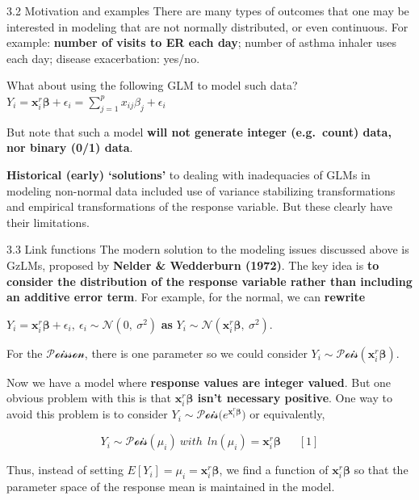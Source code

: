 \documentclass[
  9pt,
  ignorenonframetext,
]{beamer}
\begin{document}
\begin{frame}{3.2 Motivation and examples}
\protect\hypertarget{motivation-and-examples}{}
There are many types of outcomes that one may be interested in modeling
that are not normally distributed, or even continuous. For example:
\textbf{number of visits to ER each day}; number of asthma inhaler uses
each day; disease exacerbation: yes/no.

What about using the following GLM to model such data?\\
\(Y_i=\pmb x_i^r \pmb \beta+\epsilon_i=\sum_{j=1}^p x_{ij} \beta_j +\epsilon_i\)

But note that such a model \textbf{will not generate integer
(e.g.~count) data, nor binary (0/1) data}.

\textbf{Historical (early) `solutions'} to dealing with inadequacies of
GLMs in modeling non-normal data included use of variance stabilizing
transformations and empirical transformations of the response variable.
But these clearly have their limitations.
\end{frame}

\begin{frame}{3.3 Link functions}
\protect\hypertarget{link-functions}{}
The modern solution to the modeling issues discussed above is GzLMs,
proposed by \textbf{Nelder \& Wedderburn (1972)}. The key idea is
\textbf{to consider the distribution of the response variable rather
than including an additive error term}. For example, for the normal, we
can \textbf{rewrite}

\(Y_i=\pmb x_i^r \pmb \beta+\epsilon_i,\  \epsilon_i\sim \mathcal N(0,\ \sigma^2)\)
\textbf{as} \(Y_i\sim \mathcal N(\pmb x_i^r \pmb \beta,\ \sigma^2)\).

For the \(\mathcal {Poisson}\), there is one parameter so we could
consider \(Y_i \sim \mathcal {Pois} (\pmb x_i^r \pmb \beta)\).

Now we have a model where \textbf{response values are integer valued}.
But one obvious problem with this is that
\textbf{\(\pmb x_i^r \pmb \beta\) isn't necessary positive}. One way to
avoid this problem is to consider
\(Y_i \sim \mathcal {Pois} \big(e^{\pmb x_i^r \pmb \beta} \big)\) or
equivalently,

\[Y_i \sim \mathcal {Pois} (\mu_i)\ with\ \ ln(\mu_i)=\pmb x_i^r \pmb \beta \ \ \ \ \ \ \ [1]\]

Thus, instead of setting \(E[Y_i]=\mu_i=\pmb x_i^r \pmb \beta\), we find
a function of \(\pmb x_i^r \pmb \beta\) so that the parameter space of
the response mean is maintained in the model.
\end{frame}
\end{document}
